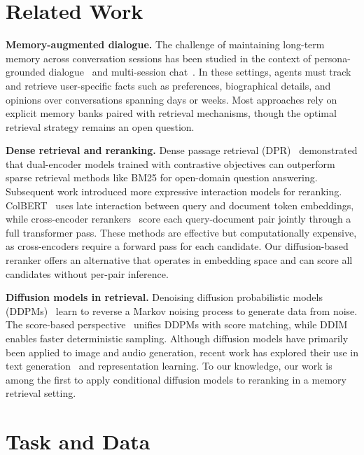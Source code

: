 \documentclass{article}
\begin{document}
\section{Related Work}
\label{sec:related}

\textbf{Memory-augmented dialogue.}
The challenge of maintaining long-term memory across conversation sessions has been studied in the context of persona-grounded dialogue~\cite{zhang2018personalizing} and multi-session chat~\cite{xu2022msc}. In these settings, agents must track and retrieve user-specific facts such as preferences, biographical details, and opinions over conversations spanning days or weeks. Most approaches rely on explicit memory banks paired with retrieval mechanisms, though the optimal retrieval strategy remains an open question.

\textbf{Dense retrieval and reranking.}
Dense passage retrieval (DPR)~\cite{karpukhin2020dpr} demonstrated that dual-encoder models trained with contrastive objectives can outperform sparse retrieval methods like BM25 for open-domain question answering. Subsequent work introduced more expressive interaction models for reranking. ColBERT~\cite{khattab2020colbert} uses late interaction between query and document token embeddings, while cross-encoder rerankers~\cite{nogueira2020passage} score each query-document pair jointly through a full transformer pass. These methods are effective but computationally expensive, as cross-encoders require a forward pass for each candidate. Our diffusion-based reranker offers an alternative that operates in embedding space and can score all candidates without per-pair inference.

\textbf{Diffusion models in retrieval.}
Denoising diffusion probabilistic models (DDPMs)~\cite{ho2020ddpm} learn to reverse a Markov noising process to generate data from noise. The score-based perspective~\cite{song2021scorebased} unifies DDPMs with score matching, while DDIM~\cite{song2021ddim} enables faster deterministic sampling. Although diffusion models have primarily been applied to image and audio generation, recent work has explored their use in text generation~\cite{li2022diffusionlm} and representation learning. To our knowledge, our work is among the first to apply conditional diffusion models to reranking in a memory retrieval setting.

\section{Task and Data}
\label{sec:task}
\end{document}

